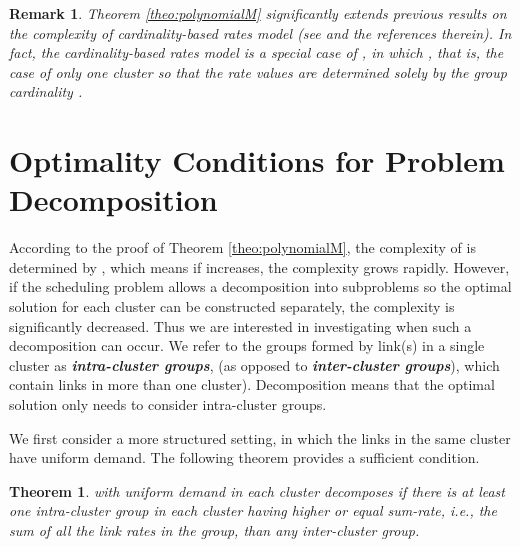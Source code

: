 \documentclass[10pt,onecolumn,journal,draftcls,oneside]{IEEEtran}
\newtheorem{theorem}{Theorem}
\newcounter{cond}
\newcounter{rema}
\newtheorem{remark}[rema]{Remark}
\begin{document}
\begin{remark}
Theorem \ref{theo:polynomialM} significantly extends previous results on the complexity of cardinality-based rates model (see \cite{j12} and the references therein). In fact, the cardinality-based rates model is a special case of , in which , that is, the case of only one cluster so that the rate values are determined solely by the group cardinality .
\end{remark}

\section{Optimality Conditions for Problem Decomposition}
\label{sec:oc}
According to the proof of Theorem \ref{theo:polynomialM}, the complexity of  is determined by , which means if  increases, the complexity grows rapidly. However, if the scheduling problem allows a decomposition into  subproblems so the optimal solution for each cluster can be constructed separately, the complexity is significantly decreased. Thus we are interested in investigating when such a decomposition can occur. We refer to the groups formed by link(s) in a single cluster as {\bf\emph{intra-cluster groups}}, (as opposed to {\bf\emph{inter-cluster groups}}), which contain links in more than one cluster). Decomposition means that the optimal solution only needs to consider intra-cluster groups.

We first consider a more structured setting, in which the links in the same cluster have uniform demand. The following theorem provides a sufficient condition. 

\begin{theorem}
\label{theo:introclu}
 with uniform demand in each cluster decomposes if there is at least one intra-cluster group in each cluster having higher or equal sum-rate, i.e., the sum of all the link rates in the group, than any inter-cluster group.
\end{theorem}
\end{document}
